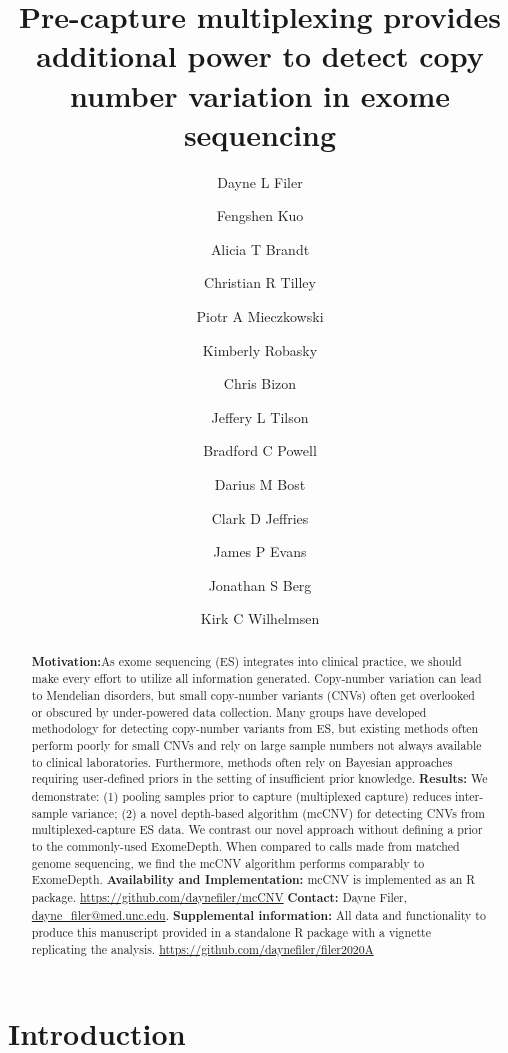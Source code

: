 \documentclass{article}\usepackage[]{graphicx}\usepackage[]{color}
\title{Pre-capture multiplexing provides additional power to detect copy number variation in exome sequencing}
\author[1,2]{Dayne L Filer}
\author[2]{Fengshen Kuo}
\author[1]{Alicia T Brandt}
\author[1]{Christian R Tilley}
\author[1]{Piotr A Mieczkowski}
\author[2]{Kimberly Robasky}
\author[2]{Chris Bizon}
\author[2]{Jeffery L Tilson}
\author[1,2]{Bradford C Powell}
\author[1,2]{Darius M Bost}
\author[1]{Clark D Jeffries}
\author[1]{James P Evans}
\author[1]{Jonathan S Berg}
\author[1,2,3]{Kirk C Wilhelmsen}
\affil[1]{UNC School of Medicine, Department of Genetics, Chapel Hill, NC}
\affil[2]{Renaissance Computing Institute, Chapel Hill, NC}
\affil[3]{UNC School of Medicine, Department of Neurology, Chapel Hill, NC}
\date{}
\begin{document}
\maketitle


\begin{abstract}
\noindent\textbf{Motivation:}As exome sequencing (ES) integrates into clinical practice, we should make every effort to utilize all information generated.
Copy-number variation can lead to Mendelian disorders, but small copy-number variants (CNVs) often get overlooked or obscured by under-powered data collection.
Many groups have developed methodology for detecting copy-number variants from ES, but existing methods often perform poorly for small CNVs and rely on large sample numbers not always available to clinical laboratories.
Furthermore, methods often rely on Bayesian approaches requiring user-defined priors in the setting of insufficient prior knowledge.
\newline
\textbf{Results:}
We demonstrate: (1) pooling samples prior to capture (multiplexed capture) reduces inter-sample variance; (2) a novel depth-based algorithm (mcCNV) for detecting CNVs from multiplexed-capture ES data.
We contrast our novel approach without defining a prior to the commonly-used ExomeDepth.
When compared to calls made from matched genome sequencing, we find the mcCNV algorithm performs comparably to ExomeDepth.
\newline
\textbf{Availability and Implementation:} mcCNV is implemented as an R package. \url{https://github.com/daynefiler/mcCNV}
\newline
\textbf{Contact:} Dayne Filer, \href{mailto:dayne_filer@med.unc.edu}{dayne\_filer@med.unc.edu}.
\newline
\textbf{Supplemental information:} All data and functionality to produce this manuscript provided in a standalone R package with a vignette replicating the analysis. \url{https://github.com/daynefiler/filer2020A}
\end{abstract}


\section{Introduction}
\end{document}
